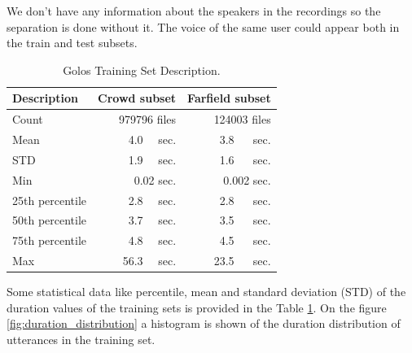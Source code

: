 \documentclass[a4paper]{article}
\begin{document}
We don't have any information about the speakers in the recordings so the separation is done without it. The voice of the same user could appear both in the train and test subsets. 

\begin{table}[t]
  \caption{Golos Training Set Description.}
  \label{tab:dataset_description}
  \centering
  \begin{tabular}{lrr}
    \toprule
    \textbf{Description}      & \textbf{Crowd  subset}     & \textbf{Farfield subset} \\
    \midrule
    Count & 979796 files & 124003 files \\
    Mean & 4.0~~ sec. & 3.8 ~~ sec. \\
    STD &  1.9~~ sec. & 1.6 ~~ sec. \\
    Min & 0.02 sec. & 0.002 sec. \\
    25th percentile& 2.8~~ sec. & 2.8 ~~ sec. \\
    50th percentile& 3.7~~ sec. & 3.5 ~~ sec. \\
    75th percentile& 4.8~~ sec. & 4.5 ~~ sec. \\
    Max & 56.3~~ sec. & 23.5 ~~ sec. \\
    \bottomrule
  \end{tabular}
\end{table}

Some statistical data like percentile, mean and standard deviation (STD) of the duration values of the training sets is provided in the Table \ref{tab:dataset_description}. On the figure \ref{fig:duration_distribution} a histogram is shown of the duration distribution of utterances in the training set.
\end{document}
